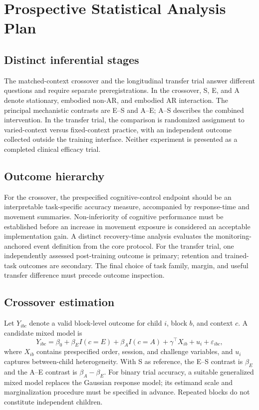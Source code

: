 \section{Prospective Statistical Analysis Plan}

\subsection{Distinct inferential stages}
The matched-context crossover and the longitudinal transfer trial answer different questions and require separate preregistrations. In the crossover, S, E, and A denote stationary, embodied non-AR, and embodied AR interaction. The principal mechanistic contrasts are E--S and A--E; A--S describes the combined intervention. In the transfer trial, the comparison is randomized assignment to varied-context versus fixed-context practice, with an independent outcome collected outside the training interface. Neither experiment is presented as a completed clinical efficacy trial.

\subsection{Outcome hierarchy}
For the crossover, the prespecified cognitive-control endpoint should be an interpretable task-specific accuracy measure, accompanied by response-time and movement summaries. Non-inferiority of cognitive performance must be established before an increase in movement exposure is considered an acceptable implementation gain. A distinct recovery-time analysis evaluates the monitoring-anchored event definition from the core protocol. For the transfer trial, one independently assessed post-training outcome is primary; retention and trained-task outcomes are secondary. The final choice of task family, margin, and useful transfer difference must precede outcome inspection.

\subsection{Crossover estimation}
Let \(Y_{ibc}\) denote a valid block-level outcome for child \(i\), block \(b\), and context \(c\). A candidate mixed model is
\[
Y_{ibc}=\beta_0+\beta_E I(c=E)+\beta_A I(c=A)
+\gamma^\top X_{ib}+u_i+\varepsilon_{ibc},
\]
where \(X_{ib}\) contains prespecified order, session, and challenge variables, and \(u_i\) captures between-child heterogeneity. With S as reference, the E--S contrast is \(\beta_E\) and the A--E contrast is \(\beta_A-\beta_E\). For binary trial accuracy, a suitable generalized mixed model replaces the Gaussian response model; its estimand scale and marginalization procedure must be specified in advance. Repeated blocks do not constitute independent children.

